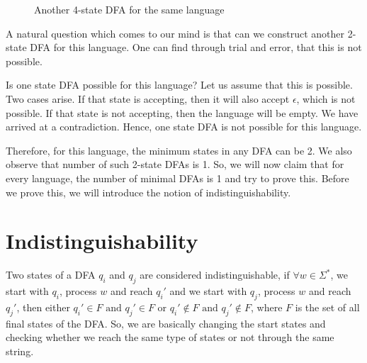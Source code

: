 \documentclass[english, 11pt]{article}
\begin{document}
\begin{figure}[htbp]
\begin{center}
\end{center}
\caption{Another 4-state DFA for the same language}
\label{fig:4state1}
\end{figure}



A natural question which comes to our mind is that can we construct another 2-state DFA for this language. One can find through trial and error, that this is not possible.


Is one state DFA possible for this language? Let us assume that this is possible. Two cases arise. If that state is accepting, then it will also accept $\epsilon$, which is not possible. If that state is not accepting, then the language will be empty. We have arrived at a contradiction. Hence, one state DFA is not possible for this language.


Therefore, for this language, the minimum states in any DFA can be 2. We also observe that number of such 2-state DFAs is 1. So, we will now claim that for every language, the number of minimal DFAs is 1 and try to prove this. Before we prove this, we will introduce the notion of indistinguishability.


\section{Indistinguishability}
Two states of a DFA $q_i$ and $q_j$ are considered indistinguishable, if $\forall w \in \Sigma^*$, we start with $q_i$, process $w$ and reach $q_i'$ and we start with $q_j$, process $w$ and reach $q_j'$, then either $q_i' \in F \text{ and } q_j' \in F$ or $q_i' \notin F \text{ and } q_j' \notin F$, where $F$ is the set of all final states of the DFA. So, we are basically changing the start states and checking whether we reach the same type of states or not through the same string.
\end{document}
